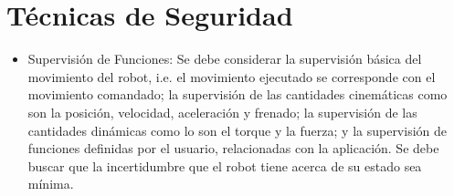 \documentclass[withindex,glossary]{cam-thesis}
\begin{document}
\section{Técnicas de Seguridad} \label{sec: Guía Seguridad :: Técnicas Seguridad}
\begin{itemize}
\item Supervisión de Funciones: Se debe considerar la supervisión básica del movimiento del robot, i.e. el movimiento ejecutado se corresponde con el movimiento comandado; la supervisión de las cantidades cinemáticas como son la posición, velocidad, aceleración y frenado; la supervisión de las cantidades dinámicas como lo son el torque y la fuerza; y la supervisión de funciones definidas por el usuario, relacionadas con la aplicación. Se debe buscar que la incertidumbre que el robot tiene acerca de su estado sea mínima.


\end{itemize}
\end{document}
